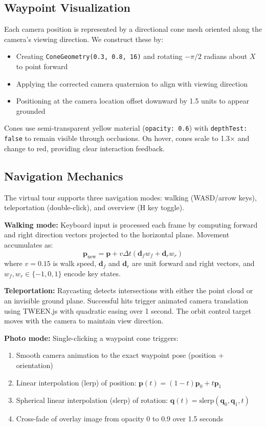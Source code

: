 \documentclass[10pt,twocolumn,letterpaper]{article}
\begin{document}
\subsection{Waypoint Visualization}

Each camera position is represented by a directional cone mesh oriented along the camera's viewing direction. We construct these by:
\begin{itemize}
\item Creating \texttt{ConeGeometry(0.3, 0.8, 16)} and rotating $-\pi/2$ radians about $X$ to point forward
\item Applying the corrected camera quaternion to align with viewing direction
\item Positioning at the camera location offset downward by 1.5 units to appear grounded
\end{itemize}

Cones use semi-transparent yellow material (\texttt{opacity: 0.6}) with \texttt{depthTest: false} to remain visible through occlusions. On hover, cones scale to 1.3× and change to red, providing clear interaction feedback.

\subsection{Navigation Mechanics}

The virtual tour supports three navigation modes: walking (WASD/arrow keys), teleportation (double-click), and overview (H key toggle).

\textbf{Walking mode:} Keyboard input is processed each frame by computing forward and right direction vectors projected to the horizontal plane. Movement accumulates as:
\begin{equation}
\mathbf{p}_{\text{new}} = \mathbf{p} + v \Delta t (\mathbf{d}_f w_f + \mathbf{d}_r w_r)
\end{equation}
where $v=0.15$ is walk speed, $\mathbf{d}_f$ and $\mathbf{d}_r$ are unit forward and right vectors, and $w_f, w_r \in \{-1, 0, 1\}$ encode key states.

\textbf{Teleportation:} Raycasting detects intersections with either the point cloud or an invisible ground plane. Successful hits trigger animated camera translation using TWEEN.js with quadratic easing over 1 second. The orbit control target moves with the camera to maintain view direction.

\textbf{Photo mode:} Single-clicking a waypoint cone triggers:
\begin{enumerate}
\item Smooth camera animation to the exact waypoint pose (position + orientation)
\item Linear interpolation (lerp) of position: $\mathbf{p}(t) = (1-t)\mathbf{p}_0 + t\mathbf{p}_1$
\item Spherical linear interpolation (slerp) of rotation: $\mathbf{q}(t) = \text{slerp}(\mathbf{q}_0, \mathbf{q}_1, t)$
\item Cross-fade of overlay image from opacity 0 to 0.9 over 1.5 seconds
\end{enumerate}
\end{document}
